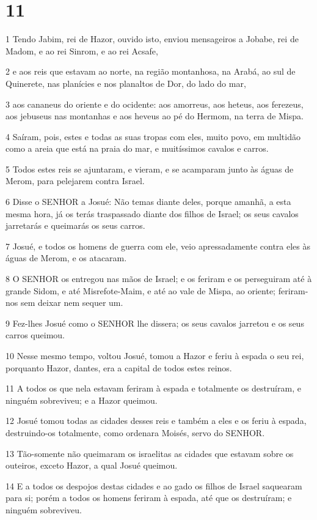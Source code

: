 \chapter{11}

\par 1 Tendo Jabim, rei de Hazor, ouvido isto, enviou mensageiros a Jobabe, rei de Madom, e ao rei Sinrom, e ao rei Acsafe,
\par 2 e aos reis que estavam ao norte, na região montanhosa, na Arabá, ao sul de Quinerete, nas planícies e nos planaltos de Dor, do lado do mar,
\par 3 aos cananeus do oriente e do ocidente: aos amorreus, aos heteus, aos ferezeus, aos jebuseus nas montanhas e aos heveus ao pé do Hermom, na terra de Mispa.
\par 4 Saíram, pois, estes e todas as suas tropas com eles, muito povo, em multidão como a areia que está na praia do mar, e muitíssimos cavalos e carros.
\par 5 Todos estes reis se ajuntaram, e vieram, e se acamparam junto às águas de Merom, para pelejarem contra Israel.
\par 6 Disse o SENHOR a Josué: Não temas diante deles, porque amanhã, a esta mesma hora, já os terás traspassado diante dos filhos de Israel; os seus cavalos jarretarás e queimarás os seus carros.
\par 7 Josué, e todos os homens de guerra com ele, veio apressadamente contra eles às águas de Merom, e os atacaram.
\par 8 O SENHOR os entregou nas mãos de Israel; e os feriram e os perseguiram até à grande Sidom, e até Misrefote-Maim, e até ao vale de Mispa, ao oriente; feriram-nos sem deixar nem sequer um.
\par 9 Fez-lhes Josué como o SENHOR lhe dissera; os seus cavalos jarretou e os seus carros queimou.
\par 10 Nesse mesmo tempo, voltou Josué, tomou a Hazor e feriu à espada o seu rei, porquanto Hazor, dantes, era a capital de todos estes reinos.
\par 11 A todos os que nela estavam feriram à espada e totalmente os destruíram, e ninguém sobreviveu; e a Hazor queimou.
\par 12 Josué tomou todas as cidades desses reis e também a eles e os feriu à espada, destruindo-os totalmente, como ordenara Moisés, servo do SENHOR.
\par 13 Tão-somente não queimaram os israelitas as cidades que estavam sobre os outeiros, exceto Hazor, a qual Josué queimou.
\par 14 E a todos os despojos destas cidades e ao gado os filhos de Israel saquearam para si; porém a todos os homens feriram à espada, até que os destruíram; e ninguém sobreviveu.
